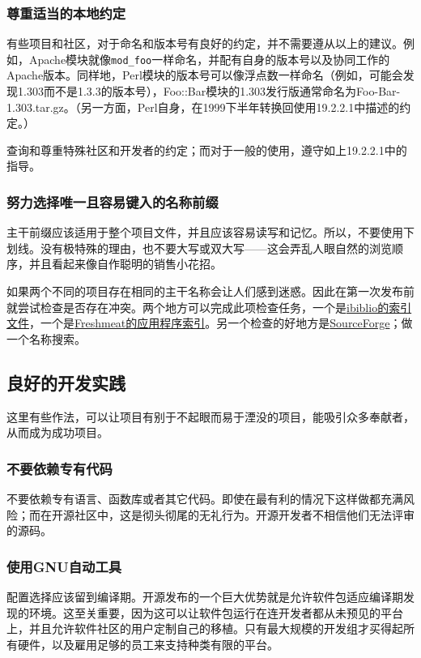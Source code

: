 \documentclass[12pt,oneside]{ctexbook}
\begin{document}
\begin{common-format}
\subsubsection{尊重适当的本地约定}
有些项目和社区，对于命名和版本号有良好的约定，并不需要遵从以上的建议。例如，Apache模块就像\verb+mod_foo+一样命名，并配有自身的版本号以及协同工作的Apache版本。同样地，Perl模块的版本号可以像浮点数一样命名（例如，可能会发现1.303而不是1.3.3的版本号），Foo::Bar模块的1.303发行版通常命名为Foo-Bar-1.303.tar.gz。（另一方面，Perl自身，在1999下半年转换回使用19.2.2.1中描述的约定。）

查询和尊重特殊社区和开发者的约定；而对于一般的使用，遵守如上19.2.2.1中的指导。

\subsubsection{努力选择唯一且容易键入的名称前缀}
主干前缀应该适用于整个项目文件，并且应该容易读写和记忆。所以，不要使用下划线。没有极特殊的理由，也不要大写或双大写——这会弄乱人眼自然的浏览顺序，并且看起来像自作聪明的销售小花招。

如果两个不同的项目存在相同的主干名称会让人们感到迷惑。因此在第一次发布前就尝试检查是否存在冲突。两个地方可以完成此项检查任务，一个是\href{http://metalab.unc.edu/pub/Linux}{ibiblio的索引文件}，一个是\href{http://www.freshmeat.net/}{Freshmeat的应用程序索引}。另一个检查的好地方是\href{http://www.sourceforge.net/}{SourceForge}；做一个名称搜索。

\subsection{良好的开发实践}
这里有些作法，可以让项目有别于不起眼而易于湮没的项目，能吸引众多奉献者，从而成为成功项目。

\subsubsection{不要依赖专有代码}
不要依赖专有语言、函数库或者其它代码。即使在最有利的情况下这样做都充满风险；而在开源社区中，这是彻头彻尾的无礼行为。开源开发者不相信他们无法评审的源码。

\subsubsection{使用GNU自动工具}
配置选择应该留到编译期。开源发布的一个巨大优势就是允许软件包适应编译期发现的环境。这至关重要，因为这可以让软件包运行在连开发者都从未预见的平台上，并且允许软件社区的用户定制自己的移植。只有最大规模的开发组才买得起所有硬件，以及雇用足够的员工来支持种类有限的平台。


\end{common-format}
\end{document}
